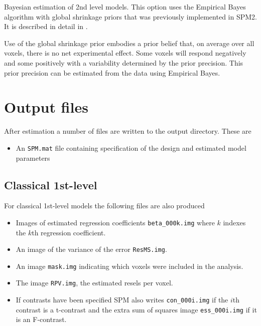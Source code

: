 Bayesian estimation of 2nd level models. This option uses the Empirical Bayes algorithm with global shrinkage priors that was previously implemented in SPM2. It is described in detail in \cite{karl_posterior}.

Use of the global shrinkage prior embodies a prior belief that, on average over all voxels, there is no net experimental effect. Some voxels will respond negatively and some positively with a variability determined by the prior precision. This prior precision can be estimated from the data using Empirical Bayes. 

\section{Output files}

After estimation a number of files are written to the output directory. These are

\begin{itemize}
\item{An \verb!SPM.mat! file containing specification of the design and estimated model parameters}
\end{itemize}

\subsection{Classical 1st-level}

For classical 1st-level models the following files are also produced

\begin{itemize}

\item{Images of estimated regression coefficients  \verb!beta_000k.img! where $k$ indexes the $k$th regression coefficient.}

\item{An image of the variance of the error \verb!ResMS.img!.}

\item{An image \verb!mask.img! indicating which voxels were included in the analysis.}

\item{The image \verb!RPV.img!, the estimated resels per voxel.}

\item{If contrasts have been specified SPM also writes \verb!con_000i.img!  if the $i$th contrast is a t-contrast and the extra sum of squares image \verb!ess_000i.img! if it is an F-contrast.} 

\end{itemize}

